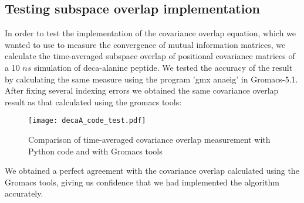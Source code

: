 \documentclass[11pt]{article}
\begin{document}
\subsection*{Testing subspace overlap implementation}
In order to test the implementation of the covariance overlap equation, which we wanted to use to measure the convergence of mutual information matrices, we calculate the time-averaged subspace overlap of positional covariance matrices of a 10 $ns$ simulation of deca-alanine peptide. We tested the accuracy of the result by calculating the same measure using the program 'gmx anaeig' in Gromacs-5.1. After fixing several indexing errors we obtained the same covariance overlap result as that calculated using the gromacs tools:
\begin{figure}[!ht]
\centering
\texttt{[image: decaA\_code\_test.pdf]}
\caption{Comparison of time-averaged covariance overlap measurement with Python code and with Gromacs tools}\label{fig:1} 
\end{figure}
We obtained a perfect agreement with the covariance overlap calculated using the Gromacs tools, giving us confidence that we had implemented the algorithm accurately.
\end{document}
